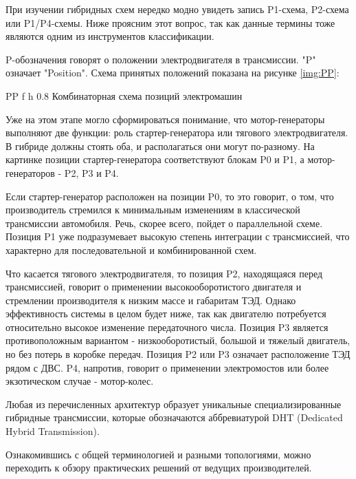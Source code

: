При изучении гибридных схем нередко модно увидеть запись P1-схема, P2-схема или P1/P4-схемы. Ниже проясним этот вопрос, так как данные термины тоже являются одним из инструментов классификации.

P-обозначения говорят о положении электродвигателя в трансмиссии. "P" означает "Position". Схема принятых положений показана на рисунке \ref{img:PP}:

    {PP} %
    {f} %
    {h} %
    {0.8\textwidth} %
    {Комбинаторная схема позиций электромашин \cite{PPschemes}} %

\newpage

Уже на этом этапе могло сформироваться понимание, что мотор-генераторы выполняют две функции: роль стартер-генератора или тягового электродвигателя. В гибриде должны стоять оба, и располагаться они могут по-разному. На картинке позиции стартер-генератора соответствуют блокам P0 и P1, а мотор-генераторов - P2, P3 и P4.

Если стартер-генератор расположен на позиции P0, то это говорит, о том, что производитель стремился к минимальным изменениям в классической трансмиссии автомобиля. Речь, скорее всего, пойдет о параллельной схеме. Позиция P1 уже подразумевает высокую степень интеграции с трансмиссией, что характерно для последовательной и комбинированной схем.

Что касается тягового электродвигателя, то позиция P2, находящаяся перед трансмиссией, говорит о применении высокооборотистого двигателя и стремлении производителя к низким массе и габаритам ТЭД. Однако эффективность системы в целом будет ниже, так как двигателю потребуется относительно высокое изменение передаточного числа. Позиция P3 является противоположным вариантом - низкооборотистый, большой и тяжелый двигатель, но без потерь в коробке передач. Позиция P2 или P3 означает расположение ТЭД рядом с ДВС. P4, напротив, говорит о применении электромостов или более экзотическом случае - мотор-колес.

Любая из перечисленных архитектур образует уникальные специализированные гибридные трансмиссии, которые обозначаются аббревиатурой DHT (Dedicated Hybrid Transmission).

Ознакомившись с общей терминологией и разными топологиями, можно переходить к обзору практических решений от ведущих производителей.

